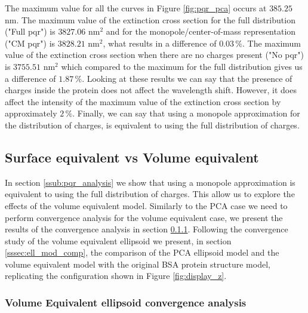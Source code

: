  The maximum value for all the curves in Figure \ref{fig:pqr_pca} occurs at $385.25$ nm. The 
 maximum value of the extinction cross section for the full distribution ("Full pqr") is $3827.06$ nm$^2$ and for 
 the monopole/center-of-mass representation ("CM pqr") is $3828.21$ nm$^2$, what results in a difference of $0.03 \,\%$. The
 maximum value of the extinction cross section when there are no charges present ("No pqr") is $3755.51$ nm$^2$ which compared to 
 the maximum for the full distribution gives us a difference of $1.87 \,\%$. Looking at these results we can say that the presence of 
 charges inside the protein does not affect the wavelength shift. However, it does affect the intensity of the maximum value of the 
 extinction cross section by approximately $2 \,\%$. Finally, we can say that using a monopole approximation for the distribution of charges, 
 is equivalent to using the full distribution of charges.

\subsection{Surface equivalent vs Volume equivalent} \label{ssec:surf_vol_ell}

In section \ref{ssub:pqr_analysis} we show that using a monopole approximation is equivalent to using the full distribution of charges. This 
allow us to explore the effects of the volume equivalent model. Similarly to the PCA case we need to perform convergence analysis for
the volume equivalent case, we present the results of the convergence analysis in section \ref{sssec:ve_conv}. Following the convergence 
study of the volume equivalent ellipsoid we present, in section \ref{sssec:ell_mod_comp}, the comparison of the PCA ellipsoid model and the volume equivalent 
model with the original BSA protein structure model, replicating the configuration shown in Figure \ref{fig:display_z}. 


\subsubsection{Volume Equivalent ellipsoid convergence analysis}\label{sssec:ve_conv}

